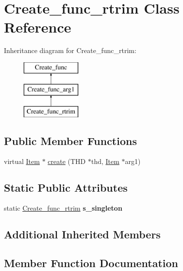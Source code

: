 \hypertarget{classCreate__func__rtrim}{}\section{Create\+\_\+func\+\_\+rtrim Class Reference}
\label{classCreate__func__rtrim}
Inheritance diagram for Create\+\_\+func\+\_\+rtrim\+:\begin{figure}[H]
\begin{center}
\leavevmode
\includegraphics[height=3.000000cm]{classCreate__func__rtrim}
\end{center}
\end{figure}
\subsection*{Public Member Functions}
\begin{DoxyCompactItemize}
\item 
virtual \mbox{\hyperlink{classItem}{Item}} $\ast$ \mbox{\hyperlink{classCreate__func__rtrim_ab0488dc9338859d0f0371558c9f72d41}{create}} (T\+HD $\ast$thd, \mbox{\hyperlink{classItem}{Item}} $\ast$arg1)
\end{DoxyCompactItemize}
\subsection*{Static Public Attributes}
\begin{DoxyCompactItemize}
\item 
\mbox{\label{classCreate__func__rtrim_af12540c7cbea5779ab4fd4133bf4a8f7}} 
static \mbox{\hyperlink{classCreate__func__rtrim}{Create\+\_\+func\+\_\+rtrim}} {\bfseries s\+\_\+singleton}
\end{DoxyCompactItemize}
\subsection*{Additional Inherited Members}


\subsection{Member Function Documentation}
\mbox{\label{classCreate__func__rtrim_ab0488dc9338859d0f0371558c9f72d41}} 
